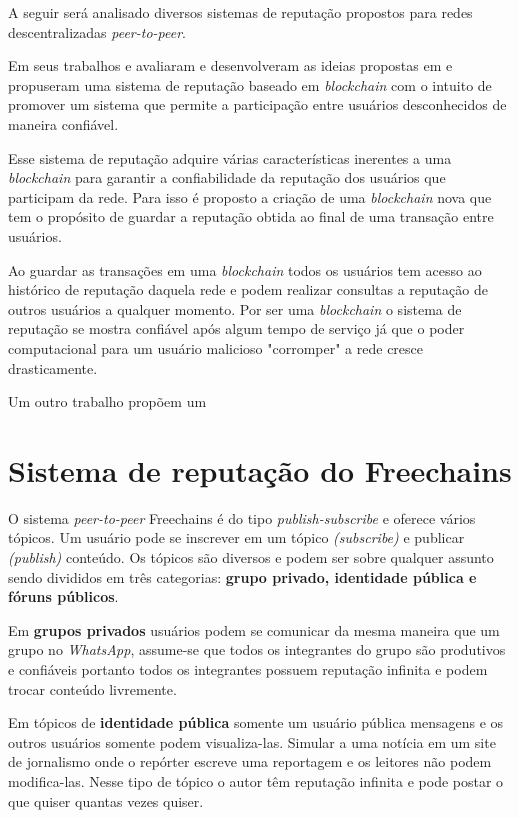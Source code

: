 \documentclass[12pt]{article}
\newcommand{\FC} {Freechains\xspace}
\newcommand{\PtoP} {\emph{peer-to-peer}\xspace}
\begin{document}
A seguir será analisado diversos sistemas de reputação propostos para redes descentralizadas \PtoP.

Em seus trabalhos \cite{dennis2015rep} e \cite{dennis2016rep} avaliaram e desenvolveram as ideias propostas em \cite{nakamoto2008peer} e propuseram uma sistema de reputação baseado em \emph{blockchain} com o intuito de promover um sistema que permite a participação entre usuários desconhecidos de maneira confiável. 

Esse sistema de reputação adquire várias características inerentes a uma \emph{blockchain} para garantir a confiabilidade da reputação dos usuários que participam da rede. Para isso é proposto a criação de uma \emph{blockchain} nova que tem o propósito de guardar a reputação obtida ao final de uma transação entre usuários.

Ao guardar as transações em uma \emph{blockchain} todos os usuários tem acesso ao histórico de reputação daquela rede e podem realizar consultas a reputação de outros usuários a qualquer momento. Por ser uma \emph{blockchain} o sistema de reputação se mostra confiável após algum tempo de serviço já que o poder computacional para um usuário malicioso "corromper" a rede cresce drasticamente.

\cite{1231515}

Um outro trabalho propõem um \cite{ekanayake2014decentralized}

\section{Sistema de reputação do \FC} \label{sec:freechains}

O sistema \PtoP \FC é do tipo \emph{publish-subscribe} e oferece vários tópicos. Um usuário pode se inscrever em um tópico \emph{(subscribe)} e publicar \emph{(publish)} conteúdo. Os tópicos são diversos e podem ser sobre qualquer assunto sendo divididos 
em três categorias: \textbf{grupo privado, identidade pública e fóruns públicos}. 

Em \textbf{grupos privados} usuários podem se comunicar da mesma maneira que um grupo no \emph{WhatsApp}, assume-se que todos os integrantes do grupo são produtivos e confiáveis portanto todos os integrantes possuem reputação infinita e podem trocar conteúdo livremente.

Em tópicos de \textbf{identidade pública} somente um usuário pública mensagens e os outros usuários somente podem visualiza-las. Simular a uma notícia em um site de jornalismo onde o repórter escreve uma reportagem e os leitores não podem modifica-las. Nesse tipo de tópico o autor têm reputação infinita e pode postar o que quiser quantas vezes quiser.
\end{document}
